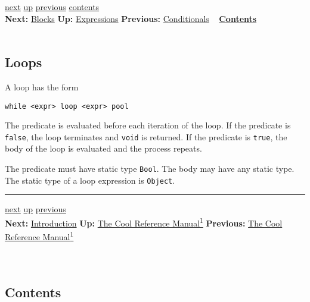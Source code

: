 \documentclass[]{article}
\begin{document}
\href{node20.html}{next} \href{node13.html}{up}
\href{node18.html}{previous} \href{node1.html}{contents} \\
\textbf{Next:} \href{node20.html}{Blocks} \textbf{Up:}
\href{node13.html}{Expressions} \textbf{Previous:}
\href{node18.html}{Conditionals} ~ \textbf{\href{node1.html}{Contents}}
\\ \\

\subsection{Loops}

A loop has the form

\begin{verbatim}
while <expr> loop <expr> pool
\end{verbatim}

The predicate is evaluated before each iteration of the loop. If the
predicate is \texttt{false}, the loop terminates and \texttt{void} is
returned. If the predicate is \texttt{true}, the body of the loop is
evaluated and the process repeats.

The predicate must have static type \texttt{Bool}. The body may have any
static type. The static type of a loop expression is \texttt{Object}.

\begin{center}\rule{3in}{0.4pt}\end{center}

\href{node2.html}{next} \href{cool-manual.html}{up}
\href{cool-manual.html}{previous} \\ \textbf{Next:}
\href{node2.html}{Introduction} \textbf{Up:} \href{cool-manual.html}{The
Cool Reference Manual\textsuperscript{1}} \textbf{Previous:}
\href{cool-manual.html}{The Cool Reference Manual\textsuperscript{1}} \\
\\ \\

\subsection{Contents}
\end{document}
